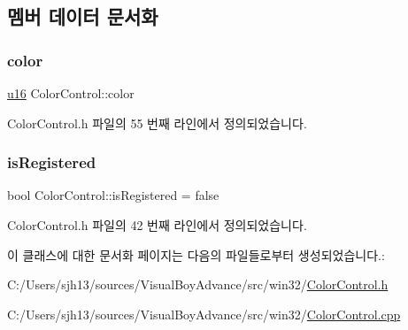 \subsection{멤버 데이터 문서화}
\mbox{\label{class_color_control_adda78267113753c247e7edcaae47f927}} 
\subsubsection{\texorpdfstring{color}{color}}
{\footnotesize\ttfamily \mbox{\hyperlink{_system_8h_a9e6c91d77e24643b888dbd1a1a590054}{u16}} Color\+Control\+::color}



Color\+Control.\+h 파일의 55 번째 라인에서 정의되었습니다.

\mbox{\label{class_color_control_a844b865ffc83cf76b50a3f7b0793619e}} 
\subsubsection{\texorpdfstring{is\+Registered}{isRegistered}}
{\footnotesize\ttfamily bool Color\+Control\+::is\+Registered = false\hspace{0.3cm}{\ttfamily [static]}}



Color\+Control.\+h 파일의 42 번째 라인에서 정의되었습니다.



이 클래스에 대한 문서화 페이지는 다음의 파일들로부터 생성되었습니다.\+:\begin{DoxyCompactItemize}
\item 
C\+:/\+Users/sjh13/sources/\+Visual\+Boy\+Advance/src/win32/\mbox{\hyperlink{_color_control_8h}{Color\+Control.\+h}}\item 
C\+:/\+Users/sjh13/sources/\+Visual\+Boy\+Advance/src/win32/\mbox{\hyperlink{_color_control_8cpp}{Color\+Control.\+cpp}}\end{DoxyCompactItemize}
